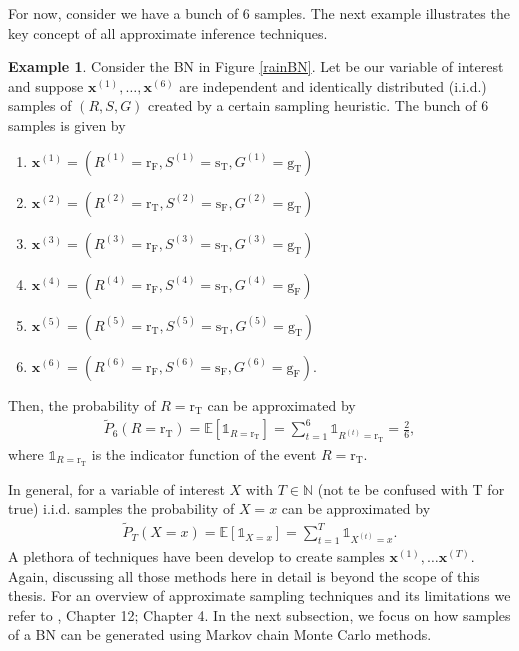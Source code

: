 \documentclass[a4paper, twoside, 11pt]{report}
\theoremstyle{plain}
\theoremstyle{definition}
\newtheorem{example}[thm]{Example}
\theoremstyle{remark}
\newcommand{\E}{{\mathbb E}}
\newcommand{\gT}{{\text{g}_\text{T} }}
\newcommand{\gF}{{\text{g}_\text{F} }}
\newcommand{\sT}{{\text{s}_\text{T} }}
\newcommand{\sF}{{\text{s}_\text{F} }}
\newcommand{\rr}{{\text{r} }}
\newcommand{\rT}{{\text{r}_\text{T} }}
\newcommand{\rF}{{\text{r}_\text{F} }}
\newcommand{\bfx}{{\mathbf{x}}}
\def\N{{\mathbb N}}
\begin{document}
For now, consider we have a bunch of $6$ samples. The next example illustrates the key concept of all approximate inference techniques.
\begin{example}\label{ex:sampling}
Consider the BN in Figure \ref{rainBN}. Let \rr be our variable of interest and suppose $\bfx^{(1)}, \ldots , \bfx^{(6)}$ are independent and identically distributed (i.i.d.) samples of $(R, S, G)$ created by a certain sampling heuristic. The bunch of $6$ samples is given by
\begin{multicols}{2}
\begin{enumerate}
\item $\bfx^{(1)} = ( R^{(1)} = \rF, S^{(1)} = \sT,  G^{(1)} = \gT)$
\item $\bfx^{(2)} = ( R^{(2)} = \rT, S^{(2)} = \sF,  G^{(2)} = \gT)$
\item $\bfx^{(3)} = ( R^{(3)} = \rF, S^{(3)} = \sT,  G^{(3)} = \gT)$
\item $\bfx^{(4)} = ( R^{(4)} = \rF, S^{(4)} = \sT,  G^{(4)} = \gF )$
\item $\bfx^{(5)} = ( R^{(5)} = \rT, S^{(5)} = \sT,  G^{(5)} = \gT)$
\item $\bfx^{(6)} = ( R^{(6)} = \rF, S^{(6)} = \sF,  G^{(6)} = \gF)$.
\end{enumerate}
\end{multicols}
\noindent Then, the probability of $R = \text{r}_\text{T}$ can be approximated by 
\begin{align*}
\widetilde{P}_6(R = \rT) = \E[ \mathds{1}_{R = \rT} ] = \sum_{t=1}^6 \mathds{1}_{R^{(t)} = \rT} = \frac{2}{6},
\end{align*}
where $\mathds{1}_{R = \rT}$ is the indicator function of the event $R = \rT$.
\end{example}
In general, for a variable of interest $X$ with $T \in \N$ (not te be confused with T  for true) i.i.d. samples the probability of $X = x$ can be approximated by 
\begin{align*}
\widetilde{P}_T(X = x) = \E[ \mathds{1}_{X=x} ] = \sum_{t=1}^T \mathds{1}_{X^{(t)} = x}.
\end{align*}
A plethora of techniques have been develop to create samples $\bfx^{(1)}, \ldots \bfx^{(T)}$. Again, discussing all those methods here in detail is beyond the scope of this thesis. For an overview of approximate sampling techniques and its limitations we refer to \cite{koller2009probabilistic}, Chapter 12; \cite{nielsen2009bayesian} Chapter 4. In the next subsection, we focus on how samples of a BN can be generated using Markov chain Monte Carlo methods. 
\end{document}
